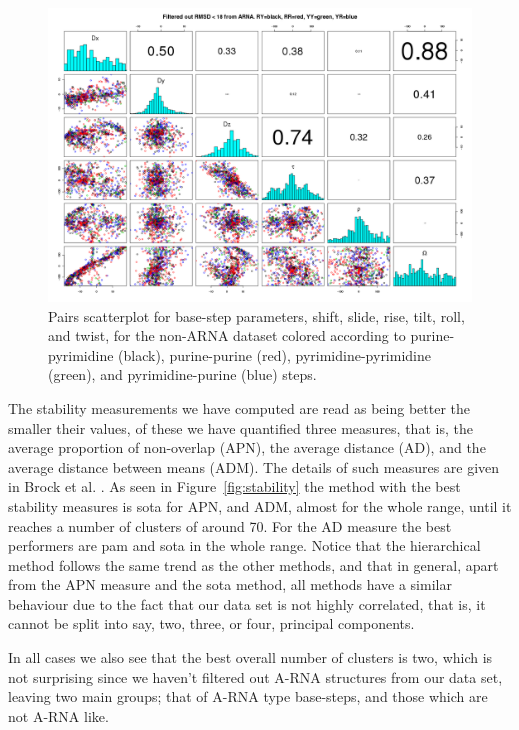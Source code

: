 \begin{figure}
 \centering
\includegraphics[angle=0, scale=0.38]{Chapter2/noarna_step.png}
\caption{Pairs  scatterplot for  base-step  parameters, shift,  slide,
  rise,  tilt,  roll, and  twist,  for  the  non-ARNA dataset  colored
  according   to  purine-pyrimidine   (black),   purine-purine  (red),
  pyrimidine-pyrimidine (green), and pyrimidine-purine (blue) steps.}
 \label{fig:pairsnoarna}
\end{figure}

The stability measurements  we have computed are read  as being better
the smaller their values, of  these we have quantified three measures,
that  is, the  average proportion  of non-overlap  (APN),  the average
distance (AD), and the average distance between means (ADM). The
details of  such measures are given  in Brock et al. \cite{brock2008}.
As  seen  in  Figure~\ref{fig:stability}  the  method  with  the  best
stability measures is  sota for APN, and ADM, almost for the whole range,
until it reaches a number of clusters of around 70. For the AD measure
the best performers are pam and  sota in the whole range.  Notice that
the hierarchical method  follows the same trend as  the other methods,
and that in  general, apart from the APN measure  and the sota method,
all methods have a similar behaviour due to the fact that our data set
is not highly  correlated, that is, it cannot be  split into say, two,
three, or four, principal components.

In all cases  we also see that the best overall  number of clusters is
two, which is not surprising since we haven't filtered out A-RNA
structures from our  data set, leaving two main  groups; that of A-RNA
type base-steps, and those which are not A-RNA like.

